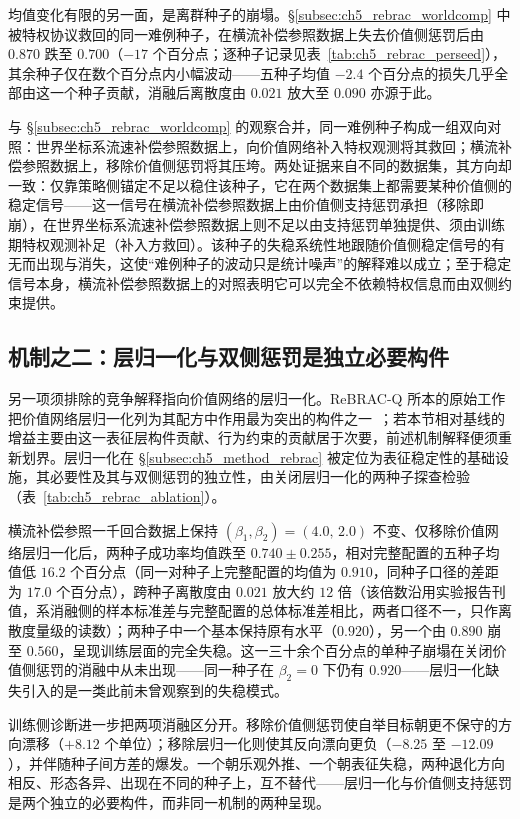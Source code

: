 均值变化有限的另一面，是离群种子的崩塌。\S\ref{subsec:ch5_rebrac_worldcomp} 中被特权协议救回的同一难例种子，在横流补偿参照数据上失去价值侧惩罚后由 $0.870$ 跌至 $0.700$（$-17$ 个百分点；逐种子记录见表~\ref{tab:ch5_rebrac_perseed}），其余种子仅在数个百分点内小幅波动——五种子均值 $-2.4$ 个百分点的损失几乎全部由这一个种子贡献，消融后离散度由 $0.021$ 放大至 $0.090$ 亦源于此。

与 \S\ref{subsec:ch5_rebrac_worldcomp} 的观察合并，同一难例种子构成一组双向对照：世界坐标系流速补偿参照数据上，向价值网络补入特权观测将其救回；横流补偿参照数据上，移除价值侧惩罚将其压垮。两处证据来自不同的数据集，其方向却一致：仅靠策略侧锚定不足以稳住该种子，它在两个数据集上都需要某种价值侧的稳定信号——这一信号在横流补偿参照数据上由价值侧支持惩罚承担（移除即崩），在世界坐标系流速补偿参照数据上则不足以由支持惩罚单独提供、须由训练期特权观测补足（补入方救回）。该种子的失稳系统性地跟随价值侧稳定信号的有无而出现与消失，这使“难例种子的波动只是统计噪声”的解释难以成立；至于稳定信号本身，横流补偿参照数据上的对照表明它可以完全不依赖特权信息而由双侧约束提供。

\subsection{机制之二：层归一化与双侧惩罚是独立必要构件}\label{subsec:ch5_rebrac_ln}

另一项须排除的竞争解释指向价值网络的层归一化。ReBRAC-Q 所本的原始工作把价值网络层归一化列为其配方中作用最为突出的构件之一~\citep{tarasov2023rebrac}；若本节相对基线的增益主要由这一表征层构件贡献、行为约束的贡献居于次要，前述机制解释便须重新划界。层归一化在 \S\ref{subsec:ch5_method_rebrac} 被定位为表征稳定性的基础设施，其必要性及其与双侧惩罚的独立性，由关闭层归一化的两种子探查检验（表~\ref{tab:ch5_rebrac_ablation}）。

横流补偿参照一千回合数据上保持 $(\beta_1,\beta_2)=(4.0,\,2.0)$ 不变、仅移除价值网络层归一化后，两种子成功率均值跌至 $0.740 \pm 0.255$，相对完整配置的五种子均值低 $16.2$ 个百分点（同一对种子上完整配置的均值为 $0.910$，同种子口径的差距为 $17.0$ 个百分点），跨种子离散度由 $0.021$ 放大约 $12$ 倍（该倍数沿用实验报告刊值，系消融侧的样本标准差与完整配置的总体标准差相比，两者口径不一，只作离散度量级的读数）；两种子中一个基本保持原有水平（$0.920$），另一个由 $0.890$ 崩至 $0.560$，呈现训练层面的完全失稳。这一三十余个百分点的单种子崩塌在关闭价值侧惩罚的消融中从未出现——同一种子在 $\beta_2 = 0$ 下仍有 $0.920$——层归一化缺失引入的是一类此前未曾观察到的失稳模式。

训练侧诊断进一步把两项消融区分开。移除价值侧惩罚使自举目标朝更不保守的方向漂移（$+8.12$ 个单位）；移除层归一化则使其反向漂向更负（$-8.25$ 至 $-12.09$），并伴随种子间方差的爆发。一个朝乐观外推、一个朝表征失稳，两种退化方向相反、形态各异、出现在不同的种子上，互不替代——层归一化与价值侧支持惩罚是两个独立的必要构件，而非同一机制的两种呈现。

